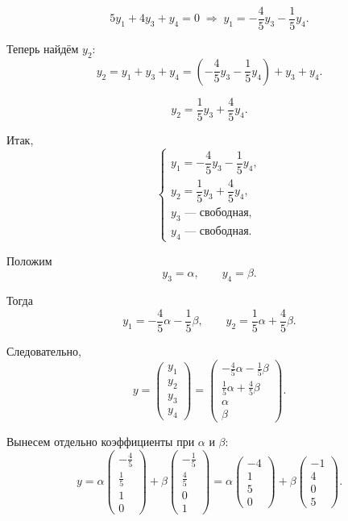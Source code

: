 \[
5y_1+4y_3+y_4=0
\;\Rightarrow\;
y_1=-\frac{4}{5}y_3-\frac{1}{5}y_4.
\]

Теперь найдём $y_2$:
\[
y_2=y_1+y_3+y_4=
\left(-\frac{4}{5}y_3-\frac{1}{5}y_4\right)+y_3+y_4.
\]

\[
y_2=\frac{1}{5}y_3+\frac{4}{5}y_4.
\]

Итак,
\[
\begin{cases}
y_1=-\dfrac45y_3-\dfrac15y_4,\\[2mm]
y_2=\dfrac15y_3+\dfrac45y_4,\\
y_3 \text{ --- свободная},\\
y_4 \text{ --- свободная}.
\end{cases}
\]

Положим
\[
y_3=\alpha,\qquad y_4=\beta.
\]

Тогда
\[
y_1=-\frac45\alpha-\frac15\beta,\qquad
y_2=\frac15\alpha+\frac45\beta.
\]

Следовательно,
\[
y=
\begin{pmatrix}
y_1\\
y_2\\
y_3\\
y_4
\end{pmatrix}
=
\begin{pmatrix}
-\frac45\alpha-\frac15\beta\\[1mm]
\frac15\alpha+\frac45\beta\\[1mm]
\alpha\\
\beta
\end{pmatrix}.
\]

Вынесем отдельно коэффициенты при $\alpha$ и $\beta$:
\[
y=
\alpha
\begin{pmatrix}
-\frac45\\[1mm]
\frac15\\[1mm]
1\\
0
\end{pmatrix}
+
\beta
\begin{pmatrix}
-\frac15\\[1mm]
\frac45\\[1mm]
0\\
1
\end{pmatrix}
=
\alpha
\begin{pmatrix}
-4\\[1mm]
1\\[1mm]
5\\
0
\end{pmatrix}
+
\beta
\begin{pmatrix}
-1\\[1mm]
4\\[1mm]
0\\
5
\end{pmatrix}.
\]


